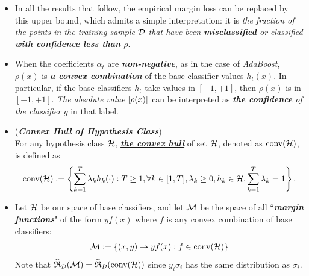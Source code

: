 \documentclass[11pt]{article}
\begin{document}
\begin{itemize}
\item \begin{remark}
In all the results that follow, the empirical margin loss can be replaced by this upper bound, which admits a simple interpretation: it is \emph{the fraction of the points in the training sample ${\mathcal D}$ that have been \textbf{misclassified} or classified \textbf{with confidence less than} $\rho$}. 
\end{remark}

\item \begin{remark}
When the coefficients $\alpha_t$ are \emph{\textbf{non-negative}}, as in the case of \emph{AdaBoost}, $\rho(x)$ is \emph{\textbf{a convex combination}} of the base classifier values $h_t(x)$. In particular, if the base classifiers $h_t$ take values in $[-1, +1]$, then $\rho(x)$ is in $[-1, +1]$. \emph{The absolute value} $\left\lvert \rho(x) \right\rvert$ can be interpreted as \emph{\textbf{the confidence} of the classifier} $g$ in that label.
\end{remark}

\item \begin{definition}(\emph{\textbf{Convex Hull of Hypothesis Class}})\\
For any hypothesis class ${\mathcal H}$, \underline{\textbf{\emph{the convex hull}}} of set ${\mathcal H}$, denoted as $\text{conv}({\mathcal H})$, is defined as 
\begin{align*}
\text{conv}({\mathcal H}) := \left\{\sum_{k=1}^{T}\lambda_k h_k(\cdot):  T \ge 1, \forall k \in [1, T], \lambda_k \ge 0, h_k \in {\mathcal H}, \sum_{k=1}^{T}\lambda_k = 1\right\}.
\end{align*}
\end{definition}

\item \begin{remark}
Let ${\mathcal H}$ be our space of base classifiers, and let ${\mathcal M}$ be the space of all ``\emph{\textbf{margin functions}}" of the form $yf(x)$ where $f$ is any convex combination of base classifiers:
\begin{align*}
{\mathcal M} := \left\{(x,y) \to yf(x): f \in  \text{conv}({\mathcal H})\right\}
\end{align*} Note that $\widehat{{\mathfrak R}}_{{\mathcal D}}({\mathcal M})  = \widehat{{\mathfrak R}}_{{\mathcal D}}(\text{conv}({\mathcal H}))$ since $y_i \sigma_i$ has the same distribution as $\sigma_i$.
\end{remark}


\end{itemize}
\end{document}
